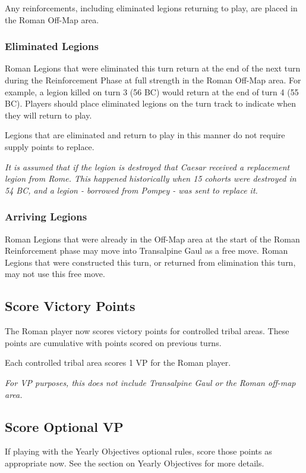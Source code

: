 Any reinforcements, including eliminated legions returning to play, are placed in the Roman Off-Map area.

\subsubsection{Eliminated Legions}
\par
Roman Legions that were eliminated this turn return at the end of the next turn during the Reinforcement Phase at full strength in the Roman Off-Map area. For example, a legion killed on turn 3 (56 BC) would return at the end of turn 4 (55 BC). Players should place eliminated legions on the turn track to indicate when they will return to play.

Legions that are eliminated and return to play in this manner do not require supply points to replace.

\textit{It is assumed that if the legion is destroyed that Caesar received a replacement legion from Rome. This happened historically when 15 cohorts were destroyed in 54 BC, and a legion - borrowed from Pompey - was sent to replace it.}

\subsubsection{Arriving Legions} \label{Arriving Legions}
\par
Roman Legions that were already in the Off-Map area at the start of the Roman Reinforcement phase may move into Transalpine Gaul as a free move. Roman Legions that were constructed this turn, or returned from elimination this turn, may not use this free move.

\subsection{Score Victory Points}
\par
The Roman player now scores victory points for controlled tribal areas. These points are cumulative with points scored on previous turns.

Each controlled tribal area scores 1 VP for the Roman player.

\textit{For VP purposes, this does not include Transalpine Gaul or the Roman off-map area.}

\subsection{Score Optional VP}
If playing with the Yearly Objectives optional rules, score those points as appropriate now. See the section on Yearly Objectives for more details.
